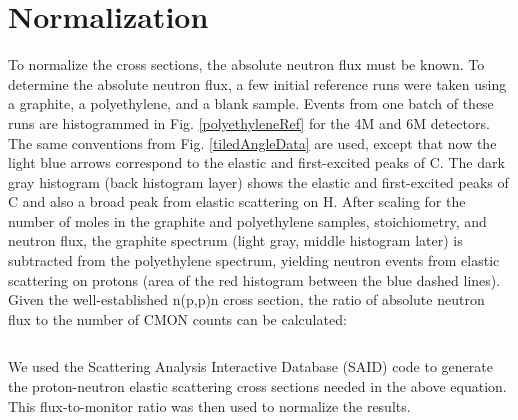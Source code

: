 \section{Normalization}
To normalize the cross sections, the absolute neutron flux must be known.
To determine the absolute neutron flux, a few initial reference runs were taken using a graphite,
a polyethylene, and a blank sample. Events from one batch of these runs are
histogrammed in Fig. \ref{polyethyleneRef} for the 4M and 6M detectors.
The same conventions from Fig.
\ref{tiledAngleData} are used, except that now the light blue arrows correspond to
the elastic and first-excited peaks of C. The dark gray histogram (back
histogram layer) shows the elastic and first-excited peaks of C
and also a broad peak from elastic scattering on H. After scaling for the number
of moles in the graphite and polyethylene samples, stoichiometry, and neutron
flux, the graphite spectrum (light gray, middle histogram later) is subtracted from the polyethylene
spectrum, yielding neutron events from elastic scattering on protons (area of
the red histogram between the blue dashed lines). Given the
well-established n(p,p)n cross section, the ratio of absolute neutron flux to
the number of CMON counts can be calculated:

\begin{equation}
\end{equation}

\noindent
We used the Scattering Analysis Interactive Database (SAID) code \cite{SAIDCode}
to generate
the proton-neutron elastic scattering cross sections needed in the above
equation. This flux-to-monitor ratio was then used to normalize the \snTwelveFour
results.

